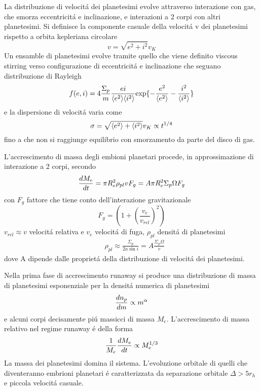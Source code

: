 La distribuzione di velocit\'a dei planetesimi evolve attraverso interazione con gas, che smorza eccentricit\'a e inclinazione, e interazioni a 2 corpi con altri planetesimi.
Si definisce la componente casuale della velocit\'a v dei planetesimi rispetto a orbita kepleriana circolare
\begin{equation}
v=\sqrt{e^2+i^2}v_K
\end{equation}
Un ensamble di planetesimi evolve tramite quello che viene definito viscous stirring verso configurazione di eccentricit\'a e inclinazione che seguano distribuzione di Rayleigh
\begin{equation}
f(e,i)=4\frac{\Sigma_p}{m}\frac{ei}{\exv{e^2}\exv{i^2}}\Exp{-\frac{e^2}{\exv{e^2}}-\frac{i^2}{\exv{i^2}}}
\end{equation}
e la dispersione di velocit\'a varia come
\begin{equation}
\sigma=\sqrt{\exv{e^2}+\exv{i^2}}v_K\propto t\expy{1/4}
\end{equation}
fino a che non si raggiunge equilibrio con smorzamento da parte del disco di gas.

L'accrescimento di massa degli embioni planetari procede, in approssimazione di interazione a 2 corpi, secondo
\begin{equation}
\TDy{t}{M_e}=\pi R_e^2\rho_{pl}v F_g=A\pi R_e^2\Sigma_p\Omega F_g\label{eq:Gaccretionpl}
\end{equation}
con $F_g$ fattore che tiene conto dell'interazione gravitazionale
\begin{equation}
F_g=(1+(\frac{v_e}{v_{rel}})^2)
\end{equation}
$v_{rel}\approx v$ velocit\'a relativa e $v_e$ velocit\'a di fuga, $\rho_{pl}$ densit\'a di planetesimi
\begin{align}
	&\rho_{pl}\approx\frac{\Sigma_p}{2a\sin{i}}=A\frac{\Sigma_p\Omega}{v}
\end{align}
dove A dipende dalle propriet\'a della distribuzione di velocit\'a dei planetesimi.

Nella prima fase di accrescimento runaway si produce una distribuzione di massa di planetesimi esponenziale per la densit\'a numerica di planetesimi
\begin{equation}
\TDy{m}{n_p}\propto m\expy{\alpha}
\end{equation}
e alcuni corpi decisamente pi\'u massicci di massa $M_e$. L'accrescimento di massa relativo nel regime runaway \'e della forma
\begin{equation}
\frac{1}{M_e}\TDy{t}{M_e}\propto M_e\expy{1/3}\label{eq:runawayaccretion}
\end{equation}
La massa dei planetesimi domina il sistema.
L'evoluzione orbitale di quelli che diventeranno embrioni planetari \'e caratterizzata da separazione orbitale $\Delta>5r_h$ e piccola velocit\'a casuale. 

